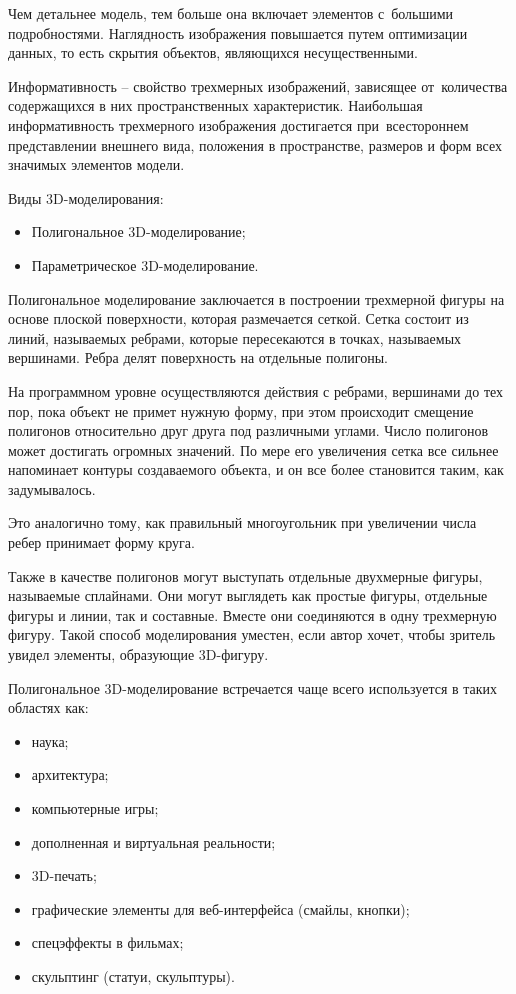 \documentclass{ou}
\begin{document}
Чем детальнее модель, тем больше она включает элементов с~большими подробностями. Наглядность изображения повышается путем оптимизации данных, то есть скрытия объектов, являющихся несущественными.

Информативность -- свойство трехмерных изображений, зависящее от~количества содержащихся в них пространственных характеристик. Наибольшая информативность трехмерного изображения достигается при~всестороннем представлении внешнего вида, положения в пространстве, размеров и форм всех значимых элементов модели\cite{sushentsov_2023}.

Виды 3D-моделирования:
\begin{itemize}[label=-, leftmargin=0em, itemindent=3.35em, nosep]
\item Полигональное 3D-моделирование;
\item Параметрическое 3D-моделирование.
\end{itemize}

Полигональное моделирование заключается в построении трехмерной фигуры на основе плоской поверхности, которая размечается сеткой. Сетка состоит из линий, называемых ребрами, которые пересекаются в точках, называемых вершинами. Ребра делят поверхность на отдельные полигоны.

На программном уровне осуществляются действия с ребрами, вершинами до тех пор, пока объект не примет нужную форму, при этом происходит смещение полигонов относительно друг друга под различными углами. Число полигонов может достигать огромных значений. По мере его увеличения сетка все сильнее напоминает контуры создаваемого объекта, и он все более становится таким, как задумывалось.

Это аналогично тому, как правильный многоугольник при увеличении числа ребер принимает форму круга.

Также в качестве полигонов могут выступать отдельные двухмерные фигуры, называемые сплайнами. Они могут выглядеть как простые фигуры, отдельные фигуры и линии, так и составные. Вместе они соединяются в одну трехмерную фигуру. Такой способ моделирования уместен, если автор хочет, чтобы зритель увидел элементы, образующие 3D-фигуру.

Полигональное 3D-моделирование встречается чаще всего используется в таких областях как:
\begin{itemize}[label=-, leftmargin=0em, itemindent=3.35em, nosep]
\item наука;
\item архитектура;
\item компьютерные игры;
\item дополненная и виртуальная реальности;
\item 3D-печать;
\item графические элементы для веб-интерфейса (смайлы, кнопки);
\item спецэффекты в фильмах;
\item скульптинг (статуи, скульптуры)\cite{gb_3d}.
\end{itemize}
\end{document}
